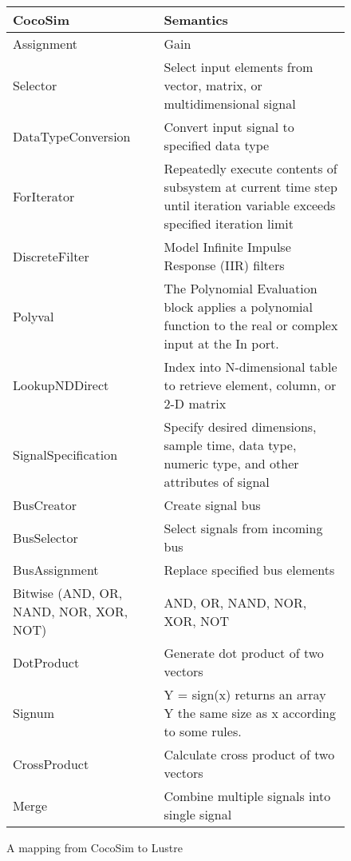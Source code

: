 \documentclass{llncs}
\begin{document}
\begin{figure}[t]
\centering
{
\begin{tabular}{lp{6cm}}
\hline
\textbf{CocoSim} & \textbf{Semantics}  \\
\hline

Assignment &
Gain
\\

Selector &
Select input elements from vector, matrix, or multidimensional signal
\\

DataTypeConversion &
Convert input signal to specified data type
\\

ForIterator &
Repeatedly execute contents of subsystem at current time step until iteration variable exceeds specified iteration limit
\\

DiscreteFilter &
Model Infinite Impulse Response (IIR) filters
\\

Polyval &
The Polynomial Evaluation block applies a polynomial function to the real or complex input at the In port.
\\

LookupNDDirect &
Index into N-dimensional table to retrieve element, column, or 2-D matrix
\\

SignalSpecification &
Specify desired dimensions, sample time, data type, numeric type, and other attributes of signal
\\

BusCreator &
Create signal bus
\\

BusSelector &
Select signals from incoming bus
\\

BusAssignment &
Replace specified bus elements
\\

Bitwise (AND, OR, NAND, NOR, XOR, NOT) &
AND, OR, NAND, NOR, XOR, NOT
\\

DotProduct &
Generate dot product of two vectors
\\

Signum &
Y = sign(x) returns an array Y the same size as x according to some rules.
\\

CrossProduct &
Calculate cross product of two vectors
\\

Merge &
Combine multiple signals into single signal
\\

\hline
\end{tabular}
}
\caption{A mapping from CocoSim to Lustre}
\label{mapping}
\end{figure}
\end{document}
